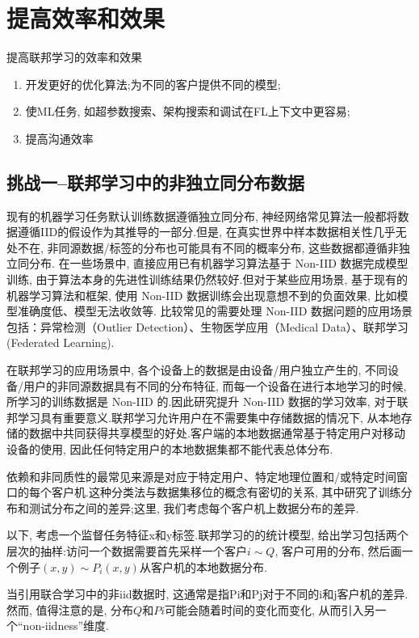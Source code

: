 \documentclass[a4paper]{article}
\theoremstyle{definition}
\numberwithin{equation}{section}
\begin{document}
\section{提高效率和效果}

提高联邦学习的效率和效果
\begin{enumerate}
    \item 开发更好的优化算法;为不同的客户提供不同的模型;
    \item 使ML任务, 如超参数搜索、架构搜索和调试在FL上下文中更容易;
    \item 提高沟通效率
\end{enumerate} 

\subsection{挑战一--联邦学习中的非独立同分布数据}
现有的机器学习任务默认训练数据遵循独立同分布, 神经网络常见算法一般都将数据遵循IID的假设作为其推导的一部分.但是, 在真实世界中样本数据相关性几乎无处不在, 非同源数据/标签的分布也可能具有不同的概率分布, 这些数据都遵循非独立同分布.
在一些场景中, 直接应用已有机器学习算法基于 Non-IID 数据完成模型训练, 由于算法本身的先进性训练结果仍然较好.但对于某些应用场景, 基于现有的机器学习算法和框架, 使用 Non-IID 数据训练会出现意想不到的负面效果, 比如模型准确度低、模型无法收敛等.
比较常见的需要处理 Non-IID 数据问题的应用场景包括：异常检测（Outlier Detection）、生物医学应用（Medical Data）、联邦学习 (Federated Learning).

在联邦学习的应用场景中, 各个设备上的数据是由设备/用户独立产生的, 不同设备/用户的非同源数据具有不同的分布特征, 而每一个设备在进行本地学习的时候, 所学习的训练数据是 Non-IID 的.因此研究提升 Non-IID 数据的学习效率, 对于联邦学习具有重要意义.联邦学习允许用户在不需要集中存储数据的情况下, 从本地存储的数据中共同获得共享模型的好处.客户端的本地数据通常基于特定用户对移动设备的使用, 因此任何特定用户的本地数据集都不能代表总体分布.


依赖和非同质性的最常见来源是对应于特定用户、特定地理位置和/或特定时间窗口的每个客户机.这种分类法与数据集移位的概念有密切的关系,  其中研究了训练分布和测试分布之间的差异;这里, 我们考虑每个客户机上数据分布的差异.

以下, 考虑一个监督任务特征x和y标签.联邦学习的的统计模型, 给出学习包括两个层次的抽样:访问一个数据需要首先采样一个客户$i\sim Q$, 客户可用的分布, 然后画一个例子$(x,  y) \sim P_i(x,  y)$从客户机的本地数据分布.

当引用联合学习中的非iid数据时, 这通常是指Pi和Pj对于不同的i和j客户机的差异.然而, 值得注意的是, 分布$Q$和$Pi$可能会随着时间的变化而变化, 从而引入另一个“non-iidness”维度.
\end{document}
